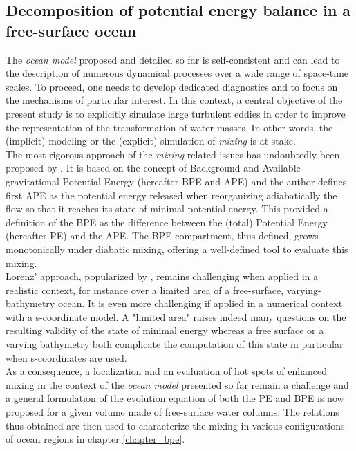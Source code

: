 

\subsection{Decomposition of potential energy balance in a free-surface ocean}

\color{blue}
The \textit{ocean model} proposed and detailed so far is self-consistent and can lead to the description of numerous dynamical processes over a wide range of space-time scales. To proceed, one needs to develop dedicated diagnostics and to focus on the mechanisms of particular interest. In this context, a central objective of the present study is to explicitly simulate large turbulent eddies in order to improve the representation of the transformation of water masses. In other words, the (implicit) modeling or the (explicit) simulation of \textit{mixing} is at stake.\\
The most rigorous approach of the \textit{mixing}-related issues has undoubtedly been proposed by \cite{lorenz_available_1955}. It is based on the concept of Background and Available gravitational Potential Energy (hereafter BPE and APE) and the author defines first APE as the potential energy released when reorganizing adiabatically the flow so that it reaches its state of minimal potential energy. This provided a definition of the BPE as the difference between the (total) Potential Energy (hereafter PE) and the APE. The BPE compartment, thus defined, grows monotonically under diabatic mixing, offering a well-defined tool to evaluate this mixing.\\
Lorenz' approach, popularized by \cite{winters_available_1995}, remains challenging when applied in a realistic context, for instance over a limited area of a free-surface, varying-bathymetry ocean. It is even more challenging if applied in a numerical context with a s-coordinate model. A "limited area" raises indeed many questions on the resulting validity of the state of minimal energy whereas a free surface or a varying bathymetry both complicate the computation of this state in particular when s-coordinates are used.\\
As a consequence, a localization and an evaluation of hot spots of enhanced mixing in the context of the \textit{ocean model} presented so far remain a challenge and a general formulation of the evolution equation of both the PE and BPE is now proposed for a given volume made of free-surface water columns. The relations thus obtained are then used to characterize the mixing in various configurations of ocean regions in chapter \ref{chapter_bpe}.


